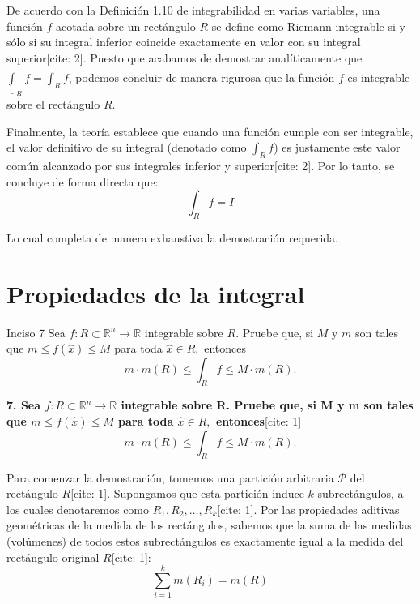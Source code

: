 \documentclass[11pt,letterpaper]{article}
\begin{document}
De acuerdo con la Definición 1.10 de integrabilidad en varias variables, una función $f$ acotada sobre un rectángulo $R$ se define como Riemann-integrable si y sólo si su integral inferior coincide exactamente en valor con su integral superior[cite: 2]. Puesto que acabamos de demostrar analíticamente que $\underline{\int}_{R}f = \overline{\int}_{R}f$, podemos concluir de manera rigurosa que la función $f$ es integrable sobre el rectángulo $R$.

Finalmente, la teoría establece que cuando una función cumple con ser integrable, el valor definitivo de su integral (denotado como $\int_{R}f$) es justamente este valor común alcanzado por sus integrales inferior y superior[cite: 2]. Por lo tanto, se concluye de forma directa que:
\begin{equation*}
\int_{R}f = I
\end{equation*}

Lo cual completa de manera exhaustiva la demostración requerida.

\section*{Propiedades de la integral}

\begin{inciso}{Inciso 7}
Sea $f:R\subset\mathbb{R}^{n}\rightarrow\mathbb{R}$ integrable sobre $R$. Pruebe que, si $M$ y $m$ son tales que $m\le f(\hat{x})\le M$ para toda $\hat{x}\in R,$ entonces
\begin{equation*}
    m\cdot m(R)\le\int_{R}f\le M\cdot m(R).
\end{equation*}
\end{inciso}

\textbf{7. Sea $f:R\subset\mathbb{R}^{n}\rightarrow\mathbb{R}$ integrable sobre R. Pruebe que, si M y m son tales que $m\le f(\hat{x})\le M$ para toda $\hat{x}\in R,$ entonces}[cite: 1]
\begin{equation*}
m\cdot m(R)\le\int_{R}f\le M\cdot m(R).
\end{equation*}

Para comenzar la demostración, tomemos una partición arbitraria $\mathcal{P}$ del rectángulo $R$[cite: 1]. Supongamos que esta partición induce $k$ subrectángulos, a los cuales denotaremos como $R_{1}, R_{2}, \dots, R_{k}$[cite: 1]. Por las propiedades aditivas geométricas de la medida de los rectángulos, sabemos que la suma de las medidas (volúmenes) de todos estos subrectángulos es exactamente igual a la medida del rectángulo original $R$[cite: 1]:
\begin{equation*}
\sum_{i=1}^{k} m(R_{i}) = m(R)
\end{equation*}
\end{document}
